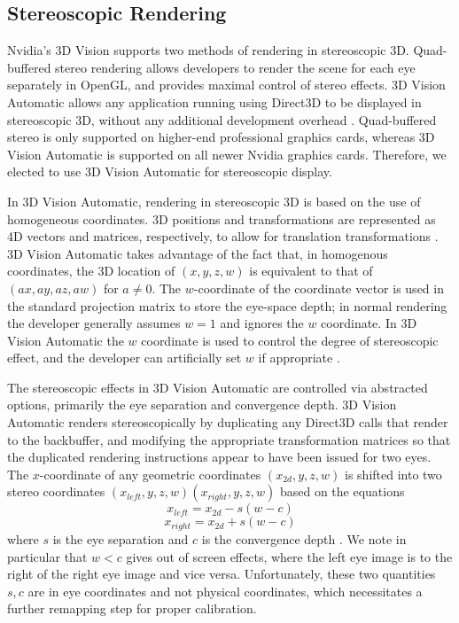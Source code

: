 \documentclass[pageno]{jpaper}
\begin{document}
\subsection{Stereoscopic Rendering}
Nvidia's 3D Vision supports two methods of rendering in stereoscopic 3D. Quad-buffered stereo rendering allows developers to render the scene for each
eye separately in OpenGL, and provides maximal control of stereo effects. 3D Vision Automatic allows any application running using Direct3D to be
displayed in stereoscopic 3D, without any additional development overhead \cite{nvidia3dvision}. Quad-buffered stereo is only supported on higher-end
professional graphics cards, whereas 3D Vision Automatic is supported on all newer Nvidia graphics cards. Therefore, we elected to use 3D Vision Automatic
for stereoscopic display.

In 3D Vision Automatic, rendering in stereoscopic 3D is based on the use of homogeneous coordinates. 3D positions and transformations are represented
as 4D vectors and matrices, respectively, to allow for translation transformations \cite{graphicstextbook}. 3D Vision Automatic takes advantage of the
fact that, in homogenous coordinates, the 3D location of $(x, y, z, w)$ is equivalent to that of $(ax, ay, az, aw)$ for $a \ne 0$. The $w$-coordinate
of the coordinate vector is used in the standard projection matrix to store the eye-space depth; in normal rendering the developer generally assumes
$w=1$ and ignores the $w$ coordinate. In 3D Vision Automatic the $w$ coordinate is used to control the degree of stereoscopic effect, and the
developer can artificially set $w$ if appropriate \cite{nvidia3dvision}.

The stereoscopic effects in 3D Vision Automatic are controlled via abstracted options, primarily the eye separation and convergence depth.
3D Vision Automatic renders stereoscopically by duplicating any Direct3D calls that render to the backbuffer, and modifying the appropriate
transformation matrices so that the duplicated rendering instructions appear to have been issued for two eyes. The $x$-coordinate of any geometric
coordinates $(x_{2d}, y, z, w)$ is shifted into two stereo coordinates $(x_{left}, y, z, w)(x_{right}, y, z, w)$ based on the equations
$$x_{left} = x_{2d} - s(w - c)$$
$$x_{right} = x_{2d} + s(w - c)$$
where $s$ is the eye separation and $c$ is the convergence depth \cite{nvidia3dvision}. We note in particular that $w<c$ gives out of screen effects, where
the left eye image is to the right of the right eye image and vice versa. Unfortunately, these two quantities $s, c$ are in eye coordinates and not
physical coordinates, which necessitates a further remapping step for proper calibration.
\end{document}
